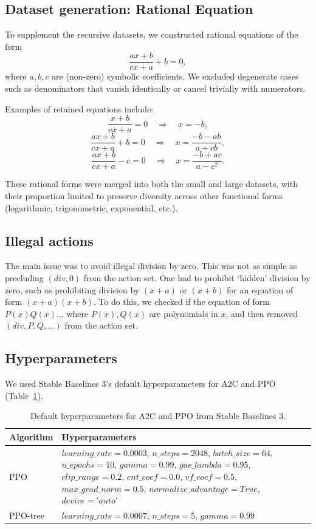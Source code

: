 \documentclass{article}
\theoremstyle{plain}
\theoremstyle{definition}
\theoremstyle{remark}
\begin{document}
\subsection{Dataset generation: Rational Equation  }

To supplement the recursive datasets, we constructed rational equations of the form
\[
\frac{a x + b}{c x + a} + b = 0,
\]
where \(a,b,c\) are (non-zero) symbolic coefficients. We excluded degenerate cases such as denominators that vanish identically or cancel trivially with numerators.

Examples of retained equations include:
\[
\frac{x+b}{c x + a} = 0 
\quad \Rightarrow \quad x = -b,
\]
\[
\frac{a x+b}{c x+a} + b = 0 
\quad \Rightarrow \quad x = \frac{-b - a b}{a + c b},
\]
\[
\frac{a x+b}{c x+a} - c = 0 
\quad \Rightarrow \quad x = \frac{-b + a c}{a - c^2}.
\]

These rational forms were merged into both the small and large datasets, with their proportion limited to preserve diversity across other functional forms (logarithmic, trigonometric, exponential, etc.).

\subsection{Illegal actions}
The main issue was to avoid illegal division by zero. This was not as simple as precluding $(div,0)$ from the action set. One had to prohibit `hidden' division by zero, such as prohibiting division by $(x+a)$ or $(x+b)$ for an equation of form $(x+a)(x+b)$. To do this, we checked if the equation of form $P(x)Q(x)..$, where $P(x),Q(x)$ are polynomials in $x$, and then removed $(div, P, Q, ...)$ from the action set.

\subsection{Hyperparameters}
We used Stable Baselines 3's default hyperparameters for A2C and PPO (Table~\ref{hyperparams}).

\begin{table}[h]
\small
\centering
\begin{tabular}{l p{}}
\toprule
\textbf{Algorithm} & \textbf{Hyperparameters} \\
\midrule
PPO & \(learning\_rate=0.0003\), \(n\_steps=2048\), \(batch\_size=64\), \(n\_epochs=10\), \(gamma=0.99\), \(gae\_lambda=0.95\), \(clip\_range=0.2\), \(ent\_coef=0.0\), \(vf\_coef=0.5\), \(max\_grad\_norm=0.5\), \(normalize\_advantage=True\), \(device='auto'\) \\
PPO-tree & \(learning\_rate=0.0007\), \(n\_steps=5\), \(gamma=0.99\)
\bottomrule
\end{tabular}
\caption{Default hyperparameters for A2C and PPO from Stable Baselines 3.}
\label{hyperparams}
\end{table}
\end{document}
